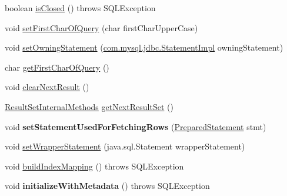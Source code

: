\begin{DoxyCompactItemize}
\item 
boolean \mbox{\hyperlink{interfacecom_1_1mysql_1_1jdbc_1_1_result_set_internal_methods_ab7d1d10caf4c61a3472928f695361c24}{is\+Closed}} ()  throws S\+Q\+L\+Exception
\item 
void \mbox{\hyperlink{interfacecom_1_1mysql_1_1jdbc_1_1_result_set_internal_methods_ab6ec147add453fc1d02e0704953a303a}{set\+First\+Char\+Of\+Query}} (char first\+Char\+Upper\+Case)
\item 
void \mbox{\hyperlink{interfacecom_1_1mysql_1_1jdbc_1_1_result_set_internal_methods_aa3a2a0beee0d27ffa2e05935497b0244}{set\+Owning\+Statement}} (\mbox{\hyperlink{classcom_1_1mysql_1_1jdbc_1_1_statement_impl}{com.\+mysql.\+jdbc.\+Statement\+Impl}} owning\+Statement)
\item 
char \mbox{\hyperlink{interfacecom_1_1mysql_1_1jdbc_1_1_result_set_internal_methods_ad7091c487cd2a0ad8550ed98e489e535}{get\+First\+Char\+Of\+Query}} ()
\item 
void \mbox{\hyperlink{interfacecom_1_1mysql_1_1jdbc_1_1_result_set_internal_methods_abda1557c737e5ac6762d58e43fae2195}{clear\+Next\+Result}} ()
\item 
\mbox{\hyperlink{interfacecom_1_1mysql_1_1jdbc_1_1_result_set_internal_methods}{Result\+Set\+Internal\+Methods}} \mbox{\hyperlink{interfacecom_1_1mysql_1_1jdbc_1_1_result_set_internal_methods_a6e4a07c50830687cccf98fb12bdd3e37}{get\+Next\+Result\+Set}} ()
\item 
\mbox{\label{interfacecom_1_1mysql_1_1jdbc_1_1_result_set_internal_methods_a1197541b6110d54cc0df97ba5fa997e9}} 
void {\bfseries set\+Statement\+Used\+For\+Fetching\+Rows} (\mbox{\hyperlink{classcom_1_1mysql_1_1jdbc_1_1_prepared_statement}{Prepared\+Statement}} stmt)
\item 
void \mbox{\hyperlink{interfacecom_1_1mysql_1_1jdbc_1_1_result_set_internal_methods_ac1fc0056e58d1648fa493b97c8a658fc}{set\+Wrapper\+Statement}} (java.\+sql.\+Statement wrapper\+Statement)
\item 
void \mbox{\hyperlink{interfacecom_1_1mysql_1_1jdbc_1_1_result_set_internal_methods_a757042b555f10a48b4955346e32de2df}{build\+Index\+Mapping}} ()  throws S\+Q\+L\+Exception
\item 
\mbox{\label{interfacecom_1_1mysql_1_1jdbc_1_1_result_set_internal_methods_a13cda17a451fc5c154ff908f042c8888}} 
void {\bfseries initialize\+With\+Metadata} ()  throws S\+Q\+L\+Exception

\end{DoxyCompactItemize}
